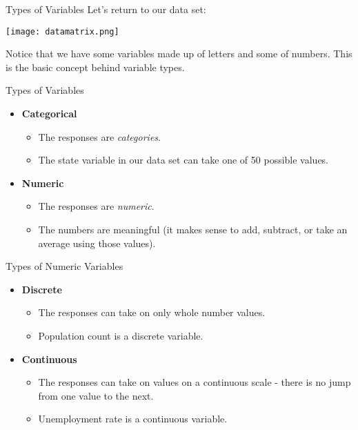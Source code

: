 \begin{frame}{Types of Variables}
    Let's return to our data set:
    \begin{center}
        \texttt{[image: datamatrix.png]}
    \end{center}
    Notice that we have some variables made up of letters and some of numbers. This is the basic concept behind variable types. 
\end{frame}

\begin{frame}{Types of Variables}
    \begin{itemize}
        \item \textbf{Categorical}
        \begin{itemize}
            \item The responses are \textit{categories}.
            \item The state variable in our data set can take one of 50 possible values. 
        \end{itemize}
        \item \textbf{Numeric}
        \begin{itemize}
            \item The responses are \textit{numeric}.
            \item The numbers are meaningful (it makes sense to add, subtract, or take an average using those values). 
        \end{itemize}
    \end{itemize}
\end{frame}

\begin{frame}{Types of Numeric Variables}
    \begin{itemize}
        \item \textbf{Discrete}
        \begin{itemize}
            \item The responses can take on only whole number values.
            \item Population count is a discrete variable.
        \end{itemize}
        \item \textbf{Continuous}
        \begin{itemize}
            \item The responses can take on values on a continuous scale - there is no jump from one value to the next.
            \item Unemployment rate is a continuous variable. 
        \end{itemize}
    \end{itemize}
\end{frame}

